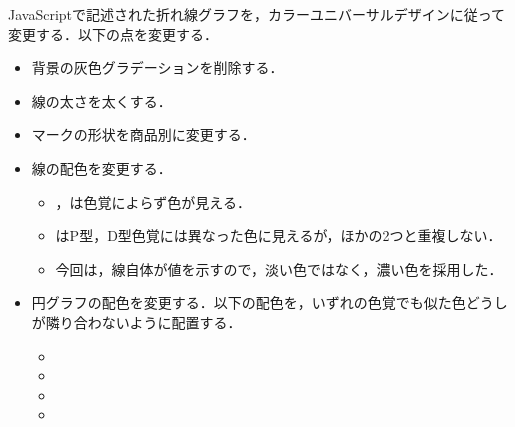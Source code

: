 \par
JavaScriptで記述された折れ線グラフを，カラーユニバーサルデザインに従って変更する．以下の点を変更する．
\begin{itemize}
    \item 背景の灰色グラデーションを削除する．
    \item 線の太さを太くする．
    \item マークの形状を商品別に変更する．
    \item 線の配色を変更する．
          \begin{itemize}
              \item {}，は色覚によらず色が見える．
              \item {}はP型，D型色覚には異なった色に見えるが，ほかの2つと重複しない．
              \item 今回は，線自体が値を示すので，淡い色ではなく，濃い色を採用した．
          \end{itemize}
\end{itemize}
\par
\begin{itemize}
    \item 円グラフの配色を変更する．以下の配色を，いずれの色覚でも似た色どうしが隣り合わないように配置する．
          \begin{itemize}
              \item {}
              \item {}
              \item {}
              \item {}
          \end{itemize}
\end{itemize}
